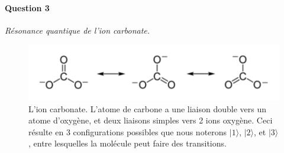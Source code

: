 \begin{enumerate}

\end{enumerate}

\newpage

\paragraph{Question 3} \textit{Résonance quantique de l'ion carbonate.} \\

\begin{figure}[h!]
\begin{center}
\includegraphics[width=0.8\columnwidth]{Pictures/Carbonate1.pdf} 
\end{center}
\caption{L'ion carbonate. L'atome de carbone a une liaison double vers un atome d'oxygène, et deux liaisons simples vers 2 ions oxygène. Ceci résulte en 3 configurations possibles que nous noterons $\vert 1 \rangle$, $\vert 2 \rangle$, et $\vert 3 \rangle$, entre lesquelles la molécule peut faire des transitions.
}
\label{fig:Carbonate1}
\end{figure}

